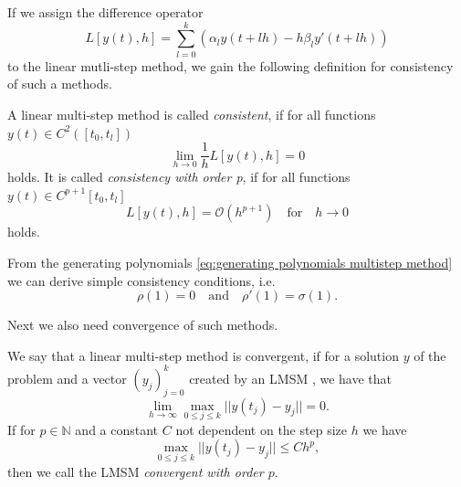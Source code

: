 	If we assign the difference operator
	\begin{equation}
		L[y(t),h] = \sum_{l=0}^{k} \left( \alpha_l y(t+lh) - h \beta_l y'(t+lh) \right)
	\end{equation}
	to the linear mutli-step method, we gain the following definition for consistency of such a methods.
	
	\begin{definition}
		A linear multi-step method is called %
		\emph{consistent}, if for all functions $y(t) \in C^2([t_0,t_l])$
		\begin{displaymath}
			\lim\limits_{h \to 0} \frac{1}{h} L[y(t),h] = 0
		\end{displaymath}
		holds. It is called \emph{consistency with order p}, if for all functions $y(t) \in C^{p+1}[t_0, t_l]$
		\begin{displaymath}
			L[y(t),h] = \mathcal{O}(h^{p+1}) \quad \text{for} \quad h \to 0
		\end{displaymath}
		holds.
	\end{definition}

	From the generating polynomials \eqref{eq:generating polynomials multistep method} we can derive simple consistency conditions, i.e.
	\begin{displaymath}
		\rho(1) = 0 \quad \text{and} \quad \rho'(1) = \sigma(1).
	\end{displaymath}

	Next we also need convergence of such methods.
	
	\begin{definition} \label{def: LMSM convergence}
		We say that a linear multi-step method is convergent, if for a solution $y$ of the problem and a vector $(y_j)_{j=0}^k$ created by an LMSM , we have that
		\begin{displaymath}
			\lim\limits_{h \to \infty} \max_{0 \leq j \leq k} ||y(t_j) - y_j|| = 0.
		\end{displaymath}
		If for $p \in \mathbb{N}$ and a constant $C$ not dependent on the step size $h$ we have
		\begin{displaymath}
			\max_{0 \leq j \leq k} ||y(t_j) - y_j|| \leq Ch^p,
		\end{displaymath}
		then we call the LMSM \emph{convergent with order $p$}.
	\end{definition}
	

